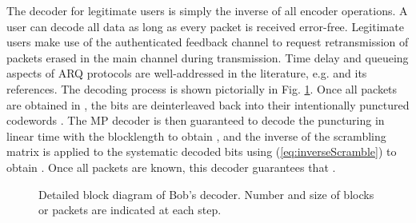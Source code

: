 \documentclass[10pt,twocolumn,twoside]{IEEEtran} \newlength{\pic}
\theoremstyle{definition}
\theoremstyle{remark}
\theoremstyle{plain}
\begin{document}
The decoder for legitimate users is simply the inverse of all encoder operations. A user can decode all data as long as every packet is received error-free. Legitimate users make use of the authenticated feedback channel to request retransmission of packets erased in the main channel during transmission. Time delay and queueing aspects of ARQ protocols are well-addressed in the literature, e.g. \cite{Konheim80} and its references. The decoding process is shown pictorially in Fig. \ref{fig:decoder}. Once all packets are obtained in , the bits are deinterleaved back into their intentionally punctured codewords . The MP decoder is then guaranteed to decode the puncturing in linear time with the blocklength to obtain  \cite{MoonArches}, and the inverse of the scrambling matrix is applied to the systematic decoded bits using (\ref{eq:inverseScramble}) to obtain . Once all packets are known, this decoder guarantees that .


\begin{figure}
\begin{center}
\end{center}
\caption{Detailed block diagram of Bob's decoder. Number and size of blocks or packets are indicated at each step.}\label{fig:decoder}
\end{figure}
\end{document}
